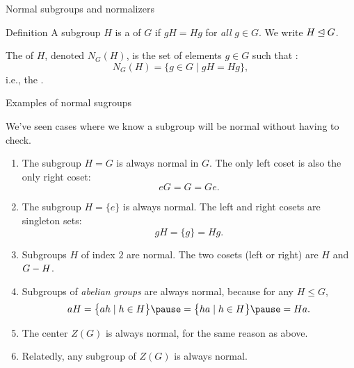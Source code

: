 \documentclass[8pt, handout]{beamer}
\newcommand{\Pause}{\pause}      %
\begin{document}
\begin{frame}{Normal subgroups and normalizers}
  \vspace{-2mm}\Pause
  
  \begin{block}{Definition}
    A subgroup $H$ is a  of $G$ if
    $gH=Hg$ for \emph{all} $g\in G$. We write $H\unlhd G$. \medskip\Pause
    
    The  of $H$, denoted
    $N_G(H)$, is the set of elements $g\in G$ such that :
    \[
    N_G(H)=\big\{g\in G\mid gH=Hg\big\},
    \]
    i.e., the . 
  \end{block}
  
\end{frame}



\begin{frame}{Examples of normal sugroups}
  
  We've seen cases where we know a subgroup will be normal
  without having to check. \medskip\Pause
  
  \begin{enumerate}
  \item The subgroup $H=G$ is always normal in $G$. \Pause The only left coset is also
    the only right coset:
    \[
    eG=G=Ge.
    \] \vspace{-4mm}\Pause
  \item The subgroup $H=\{e\}$ is always normal. \Pause The left and
    right cosets are singleton sets:
    \[
    gH=\{g\}=Hg.
    \]
    \vspace{-4mm}\Pause
  \item Subgroups $H$ of index $2$ are normal. \Pause The two cosets
    (left or right) are $H$ and $G- H$. \medskip\Pause
  \item Subgroups of \emph{abelian groups} are always normal,
    because for any $H\leq G$, 
    \[
    aH=\big\{ah\mid h\in H\big\}\Pause=\big\{ha\mid h\in H\big\}\Pause=Ha.
    \] \vspace{-4mm}\Pause
  \item The center $Z(G)$ is always normal, for the same reason as above. \Pause
  \item Relatedly, any subgroup of $Z(G)$ is always normal.
  \end{enumerate}
  
\end{frame}

\end{document}
